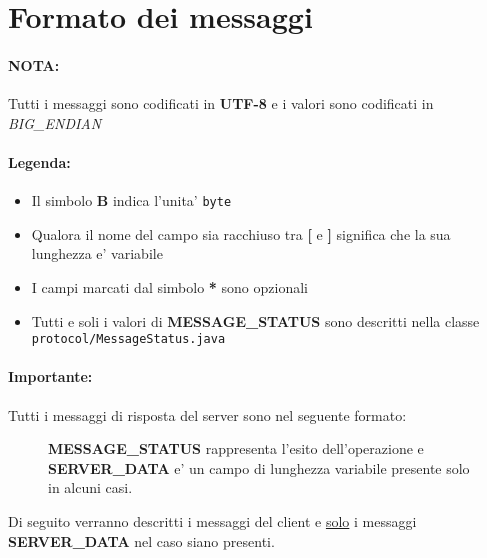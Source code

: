 \section{Formato dei messaggi}
\label{appendix:format}

\paragraph{NOTA:} Tutti i messaggi sono codificati in \textbf{UTF-8} e i valori sono codificati in \emph{BIG\_ENDIAN}
\paragraph{Legenda:}
\begin{itemize}
	\item Il simbolo \textbf{B} indica l'unita' \texttt{byte}
	\item Qualora il nome del campo sia racchiuso tra \textbf{[} e \textbf{]} significa che la sua lunghezza e' variabile
	\item I campi marcati dal simbolo \textbf{*} sono opzionali
	\item Tutti e soli i valori di \textbf{MESSAGE\_STATUS} sono descritti nella classe \texttt{protocol/MessageStatus.java}
\end{itemize}

\paragraph{Importante:} Tutti i messaggi di risposta del server sono nel seguente formato:

\begin{lrbox}{\asciiart}
	\begin{varwidth}{\maxdimen}
		\noindent
	\end{varwidth}
\end{lrbox}%

\begin{center}
	\begin{figure}[h]
		\makebox[\textwidth]{\showasciiart{80ex}}
		\centering \textbf{MESSAGE\_STATUS} rappresenta l'esito dell'operazione e \textbf{SERVER\_DATA} e' un campo di lunghezza variabile presente solo in alcuni casi.
	\end{figure}
\end{center}

Di seguito verranno descritti i messaggi del client e \underline{solo} i messaggi \textbf{SERVER\_DATA} nel caso siano presenti.


